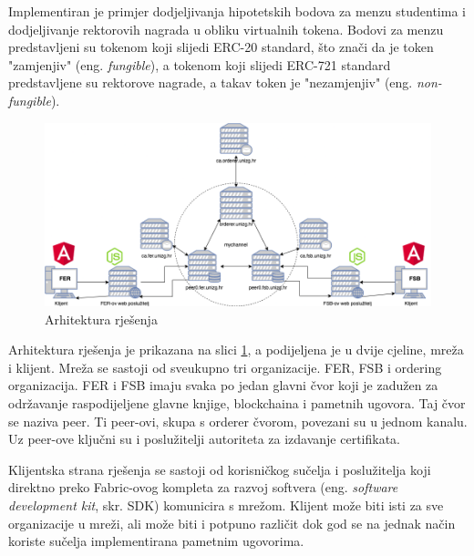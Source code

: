 \documentclass[times, utf8, diplomski]{fer}
\begin{document}
Implementiran je primjer dodjeljivanja hipotetskih bodova za menzu studentima i dodjeljivanje rektorovih nagrada u obliku virtualnih tokena. Bodovi za menzu predstavljeni su tokenom koji slijedi ERC-20 standard, što znači da je token "zamjenjiv" (eng. \textit{fungible}), a tokenom koji slijedi ERC-721 standard predstavljene su rektorove nagrade, a takav token je "nezamjenjiv" (eng. \textit{non-fungible}).

\begin{figure}[htb]
\centering
\includegraphics[scale=0.33]{imgs/Arhitektura.png}
\caption{Arhitektura rješenja}
\label{fig:arhitektura}
\end{figure}

Arhitektura rješenja je prikazana na slici \ref{fig:arhitektura},  a podijeljena je u dvije cjeline,  mreža i klijent. Mreža se sastoji od sveukupno tri organizacije. FER, FSB i ordering organizacija. FER i FSB imaju svaka po jedan glavni čvor koji je zadužen za održavanje raspodijeljene glavne knjige, blockchaina i pametnih ugovora. Taj čvor se naziva peer.  Ti peer-ovi, skupa s orderer čvorom, povezani su u jednom kanalu.  Uz peer-ove ključni su i poslužitelji autoriteta za izdavanje certifikata.

Klijentska strana rješenja se sastoji od korisničkog sučelja i poslužitelja koji direktno preko Fabric-ovog kompleta za razvoj softvera (eng. \textit{software development kit}, skr. SDK) komunicira s mrežom. Klijent može biti isti za sve organizacije u mreži, ali može biti i potpuno različit dok god se na jednak način koriste sučelja implementirana pametnim ugovorima. 
\end{document}
